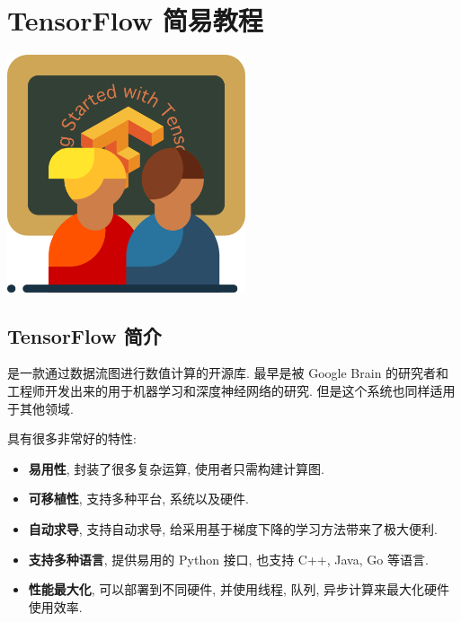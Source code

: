 
\section{TensorFlow 简易教程}
\begin{frame}{\secname}
\vfill\hspace{20pt}
\begin{minipage}[m]{0.35\textwidth}
  \linespread{1}\large
  \tableofcontents[sectionstyle = hide/hide, subsectionstyle = show/show/hide]
\end{minipage}%
\hfill%
\begin{minipage}[m]{0.5\textwidth}
  \includegraphics[height = 7cm]{./icons/lesson.pdf}
\end{minipage}%
\vfill
\end{frame}

\subsection{TensorFlow 简介}
\begin{frame}{\insertsection}{\insertsubsection}
    \tensorflow{} 是一款通过数据流图进行数值计算的开源库. \tensorflow{}  最早是被 Google Brain 的研究者和工程师开发出来的用于机器学习和深度神经网络的研究. 但是这个系统也同样适用于其他领域.

    \tensorflow{} 具有很多非常好的特性:%
    \begin{itemize}
        \item \textbf{易用性}, \tensorflow{} 封装了很多复杂运算, 使用者只需构建计算图.
        \item \textbf{可移植性}, \tensorflow{} 支持多种平台, 系统以及硬件.
        \item \textbf{自动求导}, \tensorflow{} 支持自动求导, 给采用基于梯度下降的学习方法带来了极大便利.
        \item \textbf{支持多种语言}, \tensorflow{} 提供易用的 Python 接口, 也支持 C++, Java, Go 等语言.
        \item \textbf{性能最大化}, 可以部署到不同硬件, 并使用线程, 队列, 异步计算来最大化硬件使用效率.
    \end{itemize}
\end{frame}

